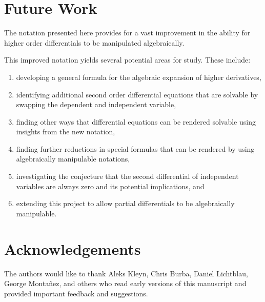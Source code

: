 \section{Future Work}
The notation presented here provides for a vast improvement in the ability for higher order differentials to be manipulated algebraically.  

This improved notation yields several potential areas for study.
These include:
\begin{enumerate}
\item developing a general formula for the algebraic expansion of higher derivatives,
\item identifying additional second order differential equations that are solvable by swapping the dependent and independent variable,
\item finding other ways that differential equations can be rendered solvable using insights from the new notation, 
\item finding further reductions in special formulas that can be rendered by using algebraically manipulable notations, 
\item investigating the conjecture that the second differential of independent variables are always zero and its potential implications, and
\item extending this project to allow partial differentials to be algebraically manipulable.
\end{enumerate}

\section{Acknowledgements}

The authors would like to thank Aleks Kleyn, Chris Burba, Daniel Lichtblau, George Monta\~nez, and others who read early versions of this manuscript and provided important feedback and suggestions.


